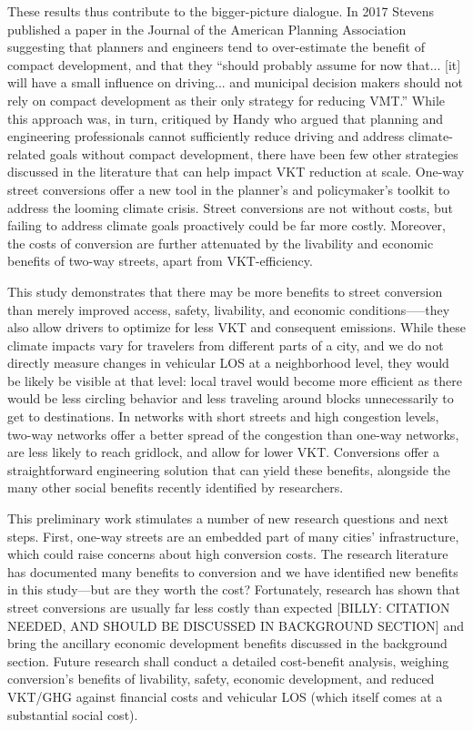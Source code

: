 \documentclass{trbunofficial}
\begin{document}
These results thus contribute to the bigger-picture dialogue. In 2017 Stevens \cite{stevens_does_2017} published a paper in the Journal of the American Planning Association suggesting that planners and engineers tend to over-estimate the benefit of compact development, and that they \enquote{should probably assume for now that... [it] will have a small influence on driving... and municipal decision makers should not rely on compact development as their only strategy for reducing VMT.} While this approach was, in turn, critiqued by Handy \cite{handy_thoughts_2017} who argued that planning and engineering professionals cannot sufficiently reduce driving and address climate-related goals without compact development, there have been few other strategies discussed in the literature that can help impact VKT reduction at scale. One-way street conversions offer a new tool in the planner's and policymaker's toolkit to address the looming climate crisis. Street conversions are not without costs, but failing to address climate goals proactively could be far more costly. Moreover, the costs of conversion are further attenuated by the livability and economic benefits of two-way streets, apart from VKT-efficiency.

This study demonstrates that there may be more benefits to street conversion than merely improved access, safety, livability, and economic conditions--—they also allow drivers to optimize for less VKT and consequent emissions. While these climate impacts vary for travelers from different parts of a city, and we do not directly measure changes in vehicular LOS at a neighborhood level, they would be likely be visible at that level: local travel would become more efficient as there would be less circling behavior and less traveling around blocks unnecessarily to get to destinations. In networks with short streets and high congestion levels, two-way networks offer a better spread of the congestion than one-way networks, are less likely to reach gridlock, and allow for lower VKT. Conversions offer a straightforward engineering solution that can yield these benefits, alongside the many other social benefits recently identified by researchers.

This preliminary work stimulates a number of new research questions and next steps. First, one-way streets are an embedded part of many cities' infrastructure, which could raise concerns about high conversion costs. The research literature has documented many benefits to conversion and we have identified new benefits in this study---but are they worth the cost? Fortunately, research has shown that street conversions are usually far less costly than expected [BILLY: CITATION NEEDED, AND SHOULD BE DISCUSSED IN BACKGROUND SECTION] and bring the ancillary economic development benefits discussed in the background section. Future research shall conduct a detailed cost-benefit analysis, weighing conversion's benefits of livability, safety, economic development, and reduced VKT/GHG against financial costs and vehicular LOS (which itself comes at a substantial social cost).
\end{document}
